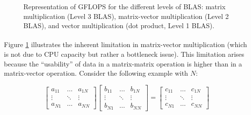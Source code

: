 \vspace*{0.5cm}

\begin{figure}[h]
\begin{center}
    
\end{center}
    \caption{Representation of GFLOPS for the different levels of BLAS: matrix multiplication (Level 3 BLAS), 
    matrix-vector multiplication (Level 2 BLAS), and vector multiplication (dot product, Level 1 BLAS).}
    \label{fig:matvec_vs_matmul}
\end{figure}

\newpage

\paragraph*{} Figure \ref{fig:matvec_vs_matmul} illustrates the inherent limitation in matrix-vector multiplication 
(which is not due to CPU capacity but rather a bottleneck issue). This limitation arises because the ``usability'' of data in a matrix-matrix operation is higher than in a matrix-vector operation. 
Consider the following example with $N$:

\begin{equation}
    \begin{bmatrix}
        a_{11} & \hdots & a_{1N} \\
        \vdots & \ddots & \vdots \\
        a_{N1} & \hdots & a_{NN} 
    \end{bmatrix}
    \begin{bmatrix}
        b_{11} & \hdots & b_{1N} \\
        \vdots & \ddots & \vdots \\
        b_{N1} & \hdots & b_{NN} 
    \end{bmatrix}
    =
    \begin{bmatrix}
        c_{11} & \hdots & c_{1N} \\
        \vdots & \ddots & \vdots \\
        c_{N1} & \hdots & c_{NN} 
    \end{bmatrix}
    \label{eq_matrix1}
\end{equation}

\vspace{0.5cm}


